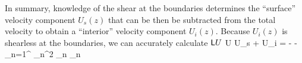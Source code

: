 \documentclass[11pt]{article}
\begin{document}


In summary, knowledge of the shear at the boundaries determines the ``surface'' velocity component $U_s(z)$ that
can be then be subtracted from the total velocity to obtain a ``interior'' velocity component $U_i(z)$. Because $U_i(z)$ is shearless at the boundaries, we can accurately calculate $\mathsf{L} U$
\beq
\sL U \approx \sL U_s + \sL U_i  =  
-   - \sum_{n=1}^{\nmax} \kappa_n^2 _n \sp_n \per
\eeq
\end{document}
